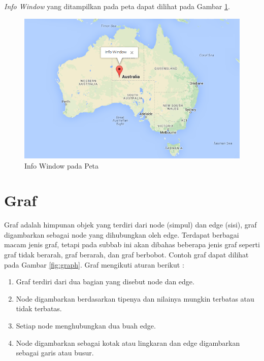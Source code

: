 \textit{Info Window} yang ditampilkan pada peta dapat dilihat pada Gambar
\ref{fig:infowindow}.
\begin{figure}[h]
\centering
\includegraphics[scale=0.6]{Gambar/infowindow}
\caption[Info Window pada Peta]{Info Window pada Peta}
\label{fig:infowindow}
\end{figure}


\section{Graf}
Graf adalah himpunan objek yang terdiri dari node (simpul) dan edge (sisi), graf 
digambarkan sebagai node yang dihubungkan oleh edge. Terdapat berbagai
macam jenis graf, tetapi pada subbab ini akan dibahas beberapa jenis graf
seperti graf tidak berarah, graf berarah, dan graf berbobot. Contoh graf dapat
dilihat pada Gambar \ref{fig:graph}. Graf mengikuti aturan berikut \footnotemark[2]:
\begin{enumerate}
\item Graf terdiri dari dua bagian yang disebut node dan edge.
\item Node digambarkan berdasarkan tipenya dan nilainya mungkin terbatas atau
tidak terbatas. 
\item Setiap node menghubungkan dua buah edge.
\item Node digambarkan sebagai kotak atau lingkaran dan edge digambarkan sebagai
garis atau busur.
\end{enumerate}

